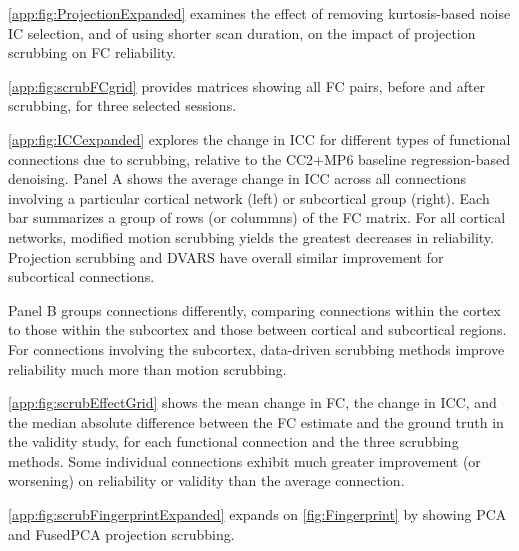 \documentclass{article}
\begin{document}

\autoref{app:fig:ProjectionExpanded} examines the effect of removing kurtosis-based noise IC selection, and of using shorter scan duration, on the impact of projection scrubbing on FC reliability. 

\autoref{app:fig:scrubFCgrid} provides matrices showing all FC pairs, before and after scrubbing, for three selected sessions. 

\autoref{app:fig:ICCexpanded} explores the change in ICC for different types of functional connections due to scrubbing, relative to the CC2+MP6 baseline regression-based denoising. Panel A shows the average change in ICC across all connections involving a particular cortical network (left) or subcortical group (right). Each bar summarizes a group of rows (or colummns) of the FC matrix. For all cortical networks, modified motion scrubbing yields the greatest decreases in reliability. Projection scrubbing and DVARS have overall similar improvement for subcortical connections. 

Panel B groups connections differently, comparing connections within the cortex to those within the subcortex and those between cortical and subcortical regions. For connections involving the subcortex, data-driven scrubbing methods improve reliability much more than motion scrubbing.  


\autoref{app:fig:scrubEffectGrid} shows the mean change in FC, the change in ICC, and the median absolute difference between the FC estimate and the ground truth in the validity study, for each functional connection and the three scrubbing methods. Some individual connections exhibit much greater improvement (or worsening) on reliability or validity than the average connection. 

\autoref{app:fig:scrubFingerprintExpanded} expands on \autoref{fig:Fingerprint} by showing PCA and FusedPCA projection scrubbing.
\end{document}
